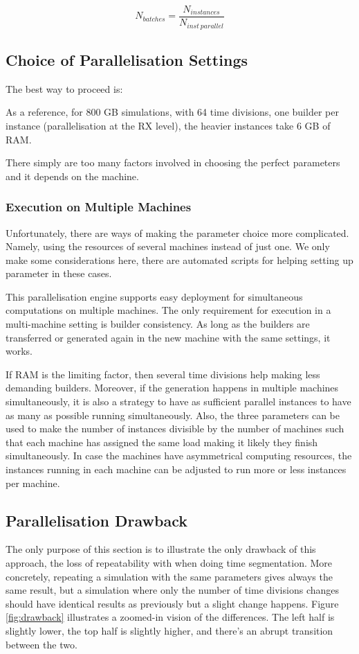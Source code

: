 \begin{equation} \label{eq:n_batches}
    N_{batches} = \frac{N_{instances}}{N_{inst \ parallel}}
\end{equation}

\subsection*{Choice of Parallelisation Settings}

The best way to proceed is:   

As a reference, for 800 GB simulations, with 64 time divisions, one builder per instance (parallelisation at the RX level), the heavier instances take 6 GB of RAM. 

There simply are too many factors involved in choosing the perfect parameters and it depends on the machine.

\subsubsection*{Execution on Multiple Machines}

Unfortunately, there are ways of making the parameter choice more complicated. Namely, using the resources of several machines instead of just one. We only make some considerations here, there are automated scripts for helping setting up parameter in these cases.

This parallelisation engine supports easy deployment for simultaneous computations on multiple machines. The only requirement for execution in a multi-machine setting is builder consistency. As long as the builders are transferred or generated again in the new machine with the same settings, it works.


If \acs{RAM} is the limiting factor, then several time divisions help making less demanding builders. Moreover, if the generation happens in multiple machines simultaneously, it is also a strategy to have as sufficient parallel instances to have as many as possible running simultaneously. Also, the three parameters can be used to make the number of instances divisible by the number of machines such that each machine has assigned the same load making it likely they finish simultaneously. In case the machines have asymmetrical computing resources, the instances running in each machine can be adjusted to run more or less instances per machine.


\subsection*{Parallelisation Drawback}
The only purpose of this section is to illustrate the only drawback of this approach, the loss of repeatability with when doing time segmentation. More concretely, repeating a simulation with the same parameters gives always the same result, but a simulation where only the number of time divisions changes should have identical results as previously but a slight change happens.
Figure \ref{fig:drawback} illustrates a zoomed-in vision of the differences. The left half is slightly lower, the top half is slightly higher, and there's an abrupt transition between the two.


